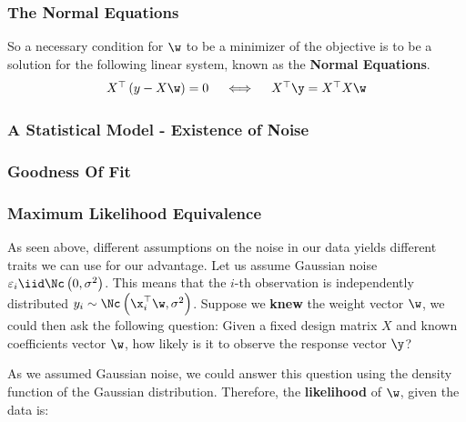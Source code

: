 \subsubsection{The Normal Equations}
So a necessary condition for $\w$ to be a minimizer of the objective is to be a solution for the following linear system, known as the \textbf{Normal Equations}.
\begin{equation}
$$ X^\top\left(y-X\w\right)=0 \quad \iff \quad X^\top\y=X^\top X\w $$
\label{eqn:normal_eq}
\end{equation}


\subsubsection{A Statistical Model - Existence of Noise}


\subsubsection{Goodness Of Fit} 

\subsubsection{Maximum Likelihood Equivalence}
As seen above, different assumptions on the noise in our data yields different traits we can use for our advantage. Let us assume Gaussian noise $\varepsilon_i\iid\Nc\left(0,\sigma^2\right)$. This means that the $i$-th observation is independently distributed $y_i\sim\Nc\left(\x_i^\top\w,\sigma^2\right)$. Suppose we \textbf{knew} the weight vector $\w$, we could then ask the following question: Given a fixed design matrix $X$ and known coefficients vector $\w$, how likely is it to observe the response vector $\y$?

As we assumed Gaussian noise, we could answer this question using the density function of the Gaussian distribution. %
Therefore, the \textbf{likelihood} of $\w$, given the data is:


